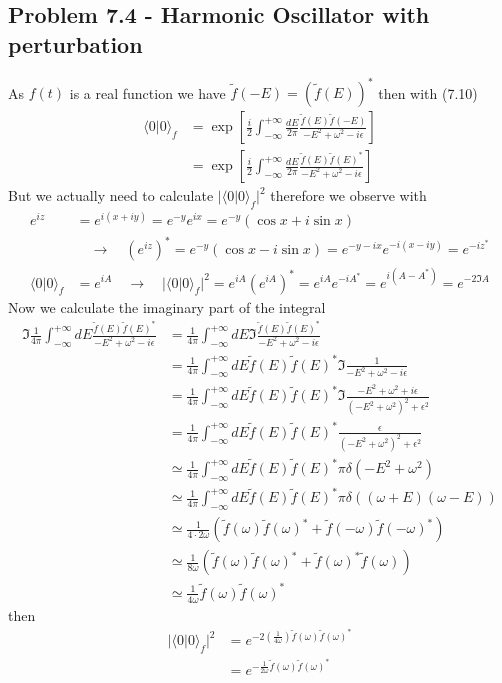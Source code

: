 \documentclass[../main.tex]{subfiles}
\begin{document}
\subsection{Problem 7.4 - Harmonic Oscillator with perturbation}
As $f(t)$ is a real function we have $\tilde f(-E)=(\tilde f(E))^*$ then with (7.10)
\begin{align}
\langle0|0\rangle_f
&=\exp\left[\frac{i}{2}\int_{-\infty}^{+\infty}\frac{dE}{2\pi}\frac{\tilde f(E)\tilde f(-E)}{-E^2+\omega^2-i\epsilon}\right]\\
&=\exp\left[\frac{i}{2}\int_{-\infty}^{+\infty}\frac{dE}{2\pi}\frac{\tilde f(E)\tilde f(E)^*}{-E^2+\omega^2-i\epsilon}\right]
\end{align}
But we actually need to calculate $|\langle0|0\rangle_f|^2$ therefore we observe with
\begin{align}
e^{iz}&=e^{i(x+iy)}=e^{-y}e^{ix}=e^{-y}(\cos x+i\sin x)\\
&\quad\rightarrow\quad (e^{iz})^*=e^{-y}(\cos x-i\sin x)=e^{-y-ix}e^{-i(x-iy)}=e^{-iz^*}\\
\langle0|0\rangle_f&=e^{iA}\quad\rightarrow\quad|\langle0|0\rangle_f|^2=e^{iA}(e^{iA})^*=e^{iA}e^{-iA^*}=e^{i(A-A^*)}=e^{-2\Im A}
\end{align}
Now we calculate the imaginary part of the integral
\begin{align}
\Im\frac{1}{4\pi}\int_{-\infty}^{+\infty}dE\frac{\tilde f(E)\tilde f(E)^*}{-E^2+\omega^2-i\epsilon}
&=\frac{1}{4\pi}\int_{-\infty}^{+\infty}dE\Im\frac{\tilde f(E)\tilde f(E)^*}{-E^2+\omega^2-i\epsilon}\\
&=\frac{1}{4\pi}\int_{-\infty}^{+\infty}dE\tilde f(E)\tilde f(E)^*\Im\frac{1}{-E^2+\omega^2-i\epsilon}\\
&=\frac{1}{4\pi}\int_{-\infty}^{+\infty}dE\tilde f(E)\tilde f(E)^*\Im\frac{-E^2+\omega^2+i\epsilon}{(-E^2+\omega^2)^2+\epsilon^2}\\
&=\frac{1}{4\pi}\int_{-\infty}^{+\infty}dE\tilde f(E)\tilde f(E)^*\frac{\epsilon}{(-E^2+\omega^2)^2+\epsilon^2}\\
&\simeq\frac{1}{4\pi}\int_{-\infty}^{+\infty}dE\tilde f(E)\tilde f(E)^*\pi\delta(-E^2+\omega^2)\\
&\simeq\frac{1}{4\pi}\int_{-\infty}^{+\infty}dE\tilde f(E)\tilde f(E)^*\pi\delta((\omega+E)(\omega-E))\\
&\simeq\frac{1}{4\cdot 2\omega}(\tilde f(\omega)\tilde f(\omega)^*+\tilde f(-\omega)\tilde f(-\omega)^*)\\
&\simeq\frac{1}{8\omega}(\tilde f(\omega)\tilde f(\omega)^*+\tilde f(\omega)^*\tilde f(\omega))\\
&\simeq\frac{1}{4\omega}\tilde f(\omega)\tilde f(\omega)^*
\end{align}
then
\begin{align}
|\langle0|0\rangle_f|^2
&=e^{-2\left(\frac{1}{4\omega}\right)\tilde f(\omega)\tilde f(\omega)^*}\\
&=e^{-\frac{1}{2\omega}\tilde f(\omega)\tilde f(\omega)^*}\\
\end{align}
\end{document}
